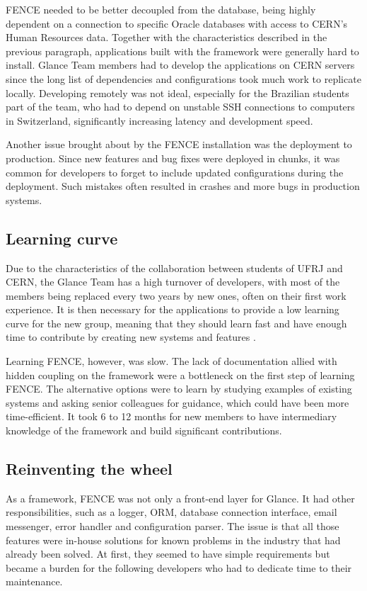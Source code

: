 FENCE needed to be better decoupled from the database, being highly dependent on a connection to specific Oracle databases with access to CERN's Human Resources data. Together with the characteristics described in the previous paragraph, applications built with the framework were generally hard to install. Glance Team members had to develop the applications on CERN servers since the long list of dependencies and configurations took much work to replicate locally. Developing remotely was not ideal, especially for the Brazilian students part of the team, who had to depend on unstable SSH connections to computers in Switzerland, significantly increasing latency and development speed.

Another issue brought about by the FENCE installation was the deployment to production. Since new features and bug fixes were deployed in chunks, it was common for developers to forget to include updated configurations during the deployment. Such mistakes often resulted in crashes and more bugs in production systems.

\subsection{Learning curve}

Due to the characteristics of the collaboration between students of UFRJ and CERN, the Glance Team has a high turnover of developers, with most of the members being replaced every two years by new ones, often on their first work experience. It is then necessary for the applications to provide a low learning curve for the new group, meaning that they should learn fast and have enough time to contribute by creating new systems and features \cite{de-jesus-tcc}.

Learning FENCE, however, was slow. The lack of documentation allied with hidden coupling on the framework were a bottleneck on the first step of learning FENCE. The alternative options were to learn by studying examples of existing systems and asking senior colleagues for guidance, which could have been more time-efficient. It took 6 to 12 months for new members to have intermediary knowledge of the framework and build significant contributions.

\subsection{Reinventing the wheel}

As a framework, FENCE was not only a front-end layer for Glance. It had other responsibilities, such as a logger, ORM, database connection interface, email messenger, error handler and configuration parser. The issue is that all those features were in-house solutions for known problems in the industry that had already been solved. At first, they seemed to have simple requirements but became a burden for the following developers who had to dedicate time to their maintenance.


